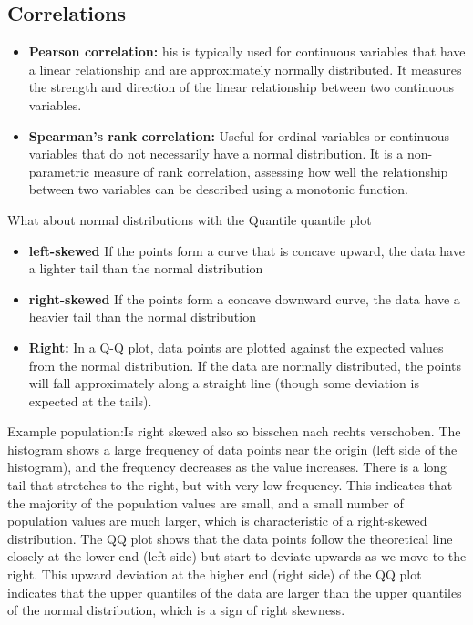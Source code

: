 \documentclass[12pt]{article}
\begin{document}
\subsection{Correlations}
\begin{itemize}
\item \textbf{Pearson correlation:} his is typically used for continuous variables that have a linear relationship and are approximately normally distributed. It measures the strength and direction of the linear relationship between two continuous variables.
\item \textbf{Spearman's rank correlation:} Useful for ordinal variables or continuous variables that do not necessarily have a normal distribution. It is a non-parametric measure of rank correlation, assessing how well the relationship between two variables can be described using a monotonic function.
\end{itemize}
What about normal distributions with the Quantile quantile plot
\begin{itemize}
	\item \textbf{left-skewed} If the points form a curve that is concave upward, the data have a lighter tail than the normal distribution 
	\item \textbf{right-skewed} If the points form a concave downward curve, the data have a heavier tail than the normal distribution 
	\item \textbf{Right:} In a Q-Q plot, data points are plotted against the expected values from the normal distribution. If the data are normally distributed, the points will fall approximately along a straight line (though some deviation is expected at the tails).
\end{itemize}
Example population:Is right skewed also so bisschen nach rechts verschoben. The histogram shows a large frequency of data points near the origin (left side of the histogram), and the frequency decreases as the value increases. There is a long tail that stretches to the right, but with very low frequency. This indicates that the majority of the population values are small, and a small number of population values are much larger, which is characteristic of a right-skewed distribution.
The QQ plot shows that the data points follow the theoretical line closely at the lower end (left side) but start to deviate upwards as we move to the right. This upward deviation at the higher end (right side) of the QQ plot indicates that the upper quantiles of the data are larger than the upper quantiles of the normal distribution, which is a sign of right skewness.
\end{document}
